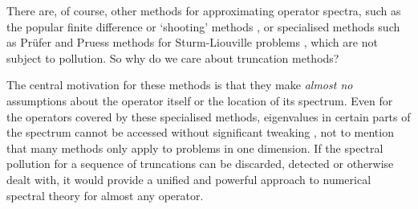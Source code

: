 \documentclass[../main.tex]{subfiles}
\begin{document}
There are, of course, other methods for approximating operator spectra, such as
the popular finite difference or `shooting' methods \cite{suli2003introduction},
or specialised methods such as Pr\"ufer and Pruess methods for Sturm-Liouville
problems \cite{pryce1993numerical}, which are not subject to pollution. So why
do we care about truncation methods?

The central motivation for these methods is that they make \emph{almost no}
assumptions about the operator itself or the location of its spectrum. Even for
the operators covered by these specialised methods, eigenvalues in certain parts
of the spectrum cannot be accessed without significant tweaking
\cite{aceto2006numerical}, not to mention that many methods only apply to
problems in one dimension. If the spectral pollution for a sequence of
truncations can be discarded, detected or otherwise dealt with, it would provide
a unified and powerful approach to numerical spectral theory for almost any operator.
\end{document}
